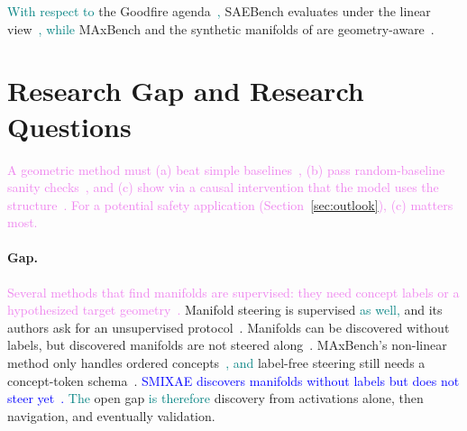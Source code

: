 \documentclass[11pt,a4paper]{article}
\newcommand{\fromextra}[1]{\textcolor{blue}{#1}}
\newcommand{\fromnotes}[1]{\textcolor{green!50!black}{#1}}
\newcommand{\fromold}[1]{\textcolor{violet}{#1}}
\newcommand{\fromclaude}[1]{\textcolor{orange!85!black}{#1}}
\newcommand{\fromprose}[1]{\textcolor{teal}{#1}}
\newcommand{\fromextra}[1]{#1}
\newcommand{\fromnotes}[1]{#1}
\newcommand{\fromold}[1]{#1}
\newcommand{\fromclaude}[1]{#1}
\newcommand{\fromprose}[1]{#1}
\begin{document}
\fromprose{With respect to} the Goodfire agenda~\cite{goodfire2026world}\fromprose{,} SAEBench evaluates under the linear view~\cite{karvonen2025saebench}\fromprose{, while} MAxBench and the synthetic manifolds of \textcite{bhalla2026saemanifolds} are geometry-aware~\cite{appapogu2026maxbench}.

\section{Research Gap and Research Questions}\label{sec:thesis}
\fromold{A geometric method must (a) beat simple baselines~\cite{wu2025axbench}, (b) pass random-baseline sanity checks~\cite{korznikov2026sanity}, and (c) show via a causal intervention that the model uses the structure~\cite{wurgaft2026manifoldsteering}. For a potential safety application (\fromclaude{Section~\ref{sec:outlook}}), (c) matters most.}

\paragraph{Gap.}
\fromold{Several methods that find manifolds are supervised: they need concept labels or a hypothesized target geometry~\cite{modell2026probing,tiblias2026smds}.}
\fromnotes{Manifold steering is supervised \fromprose{as well,} and its authors ask for an unsupervised protocol~\cite{wurgaft2026manifoldsteering}.}
\fromnotes{Manifolds can be discovered without labels, but discovered manifolds are not steered along~\cite{bhalla2026saemanifolds}.}
\fromnotes{MAxBench's non-linear method only handles ordered concepts~\cite{appapogu2026maxbench}\fromprose{, and} label-free steering still needs a concept-token schema~\cite{oozeer2026riemannian}.}
\fromextra{SMIXAE discovers manifolds without labels but does not steer yet~\cite{francel2026smixae}.}
\fromnotes{\fromprose{The} open gap \fromprose{is therefore} discovery from activations alone, then navigation, and eventually validation.}
\end{document}
